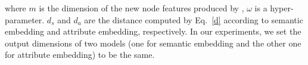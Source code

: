 	where $m$ is the dimension of the new node features produced by \HRGCNs, $\omega$ is a hyper-parameter. $d_s$ and $d_a$ are the distance computed by Eq.~\ref{d} according to semantic embedding and attribute embedding, respectively.
	In our experiments, we set the output dimensions of two models (one for semantic embedding and the other one for attribute embedding) to be the same.
	
	
